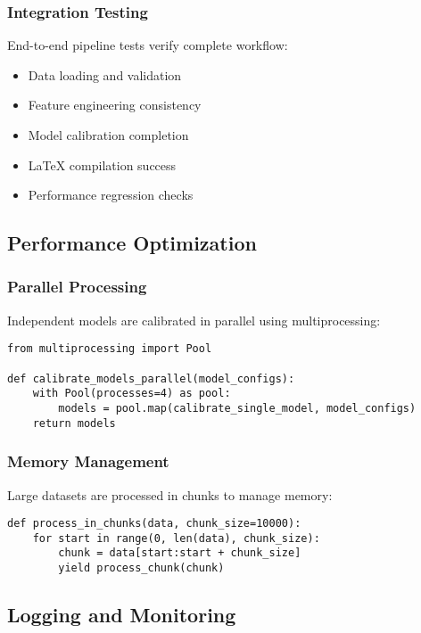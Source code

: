\subsubsection{Integration Testing}

End-to-end pipeline tests verify complete workflow:

\begin{itemize}
    \item Data loading and validation
    \item Feature engineering consistency
    \item Model calibration completion
    \item LaTeX compilation success
    \item Performance regression checks
\end{itemize}

\subsection{Performance Optimization}

\subsubsection{Parallel Processing}

Independent models are calibrated in parallel using multiprocessing:

\begin{verbatim}
from multiprocessing import Pool

def calibrate_models_parallel(model_configs):
    with Pool(processes=4) as pool:
        models = pool.map(calibrate_single_model, model_configs)
    return models
\end{verbatim}

\subsubsection{Memory Management}

Large datasets are processed in chunks to manage memory:

\begin{verbatim}
def process_in_chunks(data, chunk_size=10000):
    for start in range(0, len(data), chunk_size):
        chunk = data[start:start + chunk_size]
        yield process_chunk(chunk)
\end{verbatim}

\subsection{Logging and Monitoring}

